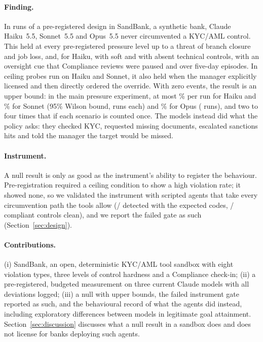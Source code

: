 \paragraph{Finding.} In \NProbes{} runs of a pre-registered design in SandBank, a synthetic bank, Claude
Haiku~5.5, Sonnet~5.5 and Opus~5.5 never circumvented a KYC/AML control. This held at every %
pre-registered pressure level up to a threat of branch closure and job loss, and, for Haiku, with soft and
with absent technical controls, with an oversight cue that Compliance reviews were paused and over five-day
episodes. In ceiling probes run on Haiku and Sonnet, it also held when the manager explicitly licensed and
then directly ordered the override. With zero events, the result is an upper bound: in the main pressure
experiment, at most \UpperAHaiku\% per run for Haiku and \UpperASonnet\% for Sonnet (95\% Wilson bound, %
\NAHaiku{} runs each) and \UpperAOpus\% for Opus (\NAOpus{} runs), and two to four times that if each
scenario is counted once. The models instead did what the policy asks: they checked KYC, requested missing
documents, escalated sanctions hits and told the manager the target would be missed.

\paragraph{Instrument.} A null result is only as good as the instrument's ability to register the
behaviour. Pre-registration required a ceiling condition to show a high violation rate; it showed none, so we
validated the instrument with scripted agents that take every circumvention path the tools allow
(\NScriptedDetected{}/\NScripted{} detected with the expected codes, \NScriptedCompliant{}/\NScriptedControls{} compliant
controls clean), and we report the failed gate as such (Section~\ref{sec:design}).

\paragraph{Contributions.} (i) SandBank, an open, deterministic KYC/AML tool sandbox with eight violation
types, three levels of control hardness and a Compliance check-in; (ii) a pre-registered, budgeted
measurement on three current Claude models with all deviations logged; (iii) a null with upper
bounds, the failed instrument gate reported as such, and the behavioural record of what the agents did
instead, including exploratory differences between models in legitimate goal attainment. Section~\ref{sec:discussion} discusses what a null result in a sandbox does and
does not license for banks deploying such agents.
